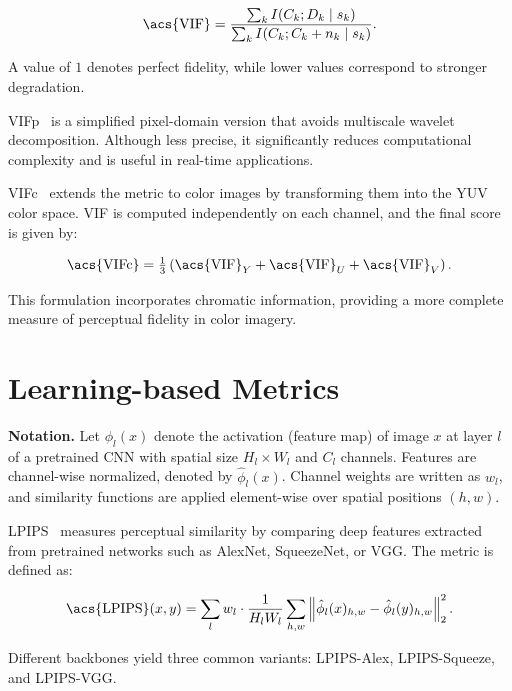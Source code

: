 \begin{equation}
\text{\acs{VIF}} = 
\frac{\sum_{k} I\!\left(C_k; D_k \mid s_k\right)}
     {\sum_{k} I\!\left(C_k; C_k + n_k \mid s_k\right)}.
\end{equation}

A value of $1$ denotes perfect fidelity, while lower values correspond to stronger degradation.

\acf{VIFp}~\cite{sheikh2006vif} is a simplified pixel-domain version that avoids multiscale wavelet decomposition. Although less precise, it significantly reduces computational complexity and is useful in real-time applications.

\acf{VIFc}~\cite{sheikh2006vif} extends the metric to color images by transforming them into the YUV color space. \acs{VIF} is computed independently on each channel, and the final score is given by:

\begin{equation}
\text{\acs{VIFc}} = \tfrac{1}{3}\left(\text{\acs{VIF}}_Y + \text{\acs{VIF}}_U + \text{\acs{VIF}}_V\right).
\end{equation}

This formulation incorporates chromatic information, providing a more complete measure of perceptual fidelity in color imagery.

\section{Learning-based Metrics}\label{app:sec:learning_based_metrics}

\noindent\textbf{Notation.} Let $\phi_l(x)$ denote the activation (feature map) of image $x$ at layer $l$ of a pretrained \acf{CNN} with spatial size $H_l \times W_l$ and $C_l$ channels. Features are channel-wise normalized, denoted by $\hat{\phi}_l(x)$. Channel weights are written as $w_l$, and similarity functions are applied element-wise over spatial positions $(h,w)$.

\acf{LPIPS}~\cite{zhang2018lpips} measures perceptual similarity by comparing deep features extracted from pretrained networks such as AlexNet, SqueezeNet, or \acf{VGG}. The metric is defined as:

\begin{equation}
\text{\acs{LPIPS}}(x,y) = \sum_{l} w_l \cdot \frac{1}{H_l W_l} 
\sum_{h,w} \left\| \hat{\phi}_l(x)_{h,w} - \hat{\phi}_l(y)_{h,w} \right\|_2^2.
\end{equation}

Different backbones yield three common variants: \acs{LPIPS}-Alex, \acs{LPIPS}-Squeeze, and \acs{LPIPS}-\acs{VGG}.


